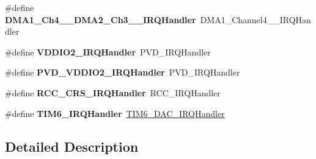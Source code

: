 \begin{DoxyCompactItemize}
\item 
\mbox{\label{group__stm32f051x8_ga035f9aa47c046222541cca70e281b415}} 
\#define {\bfseries D\+M\+A1\+\_\+\+Ch4\+\_\+\_\+\+D\+M\+A2\+\_\+\+Ch3\+\_\+\_\+\+I\+R\+Q\+Handler}~D\+M\+A1\+\_\+\+Channel4\+\_\+\_\+\+I\+R\+Q\+Handler
\item 
\mbox{\label{group__stm32f051x8_gac1854dcfbcf2950cee25063d73a5edb0}} 
\#define {\bfseries V\+D\+D\+I\+O2\+\_\+\+I\+R\+Q\+Handler}~P\+V\+D\+\_\+\+I\+R\+Q\+Handler
\item 
\mbox{\label{group__stm32f051x8_ga9a2577324b65f147fff0fc4f38dcf5e2}} 
\#define {\bfseries P\+V\+D\+\_\+\+V\+D\+D\+I\+O2\+\_\+\+I\+R\+Q\+Handler}~P\+V\+D\+\_\+\+I\+R\+Q\+Handler
\item 
\mbox{\label{group__stm32f051x8_ga82a9eac30db2cc914975bc71ce5fcb92}} 
\#define {\bfseries R\+C\+C\+\_\+\+C\+R\+S\+\_\+\+I\+R\+Q\+Handler}~R\+C\+C\+\_\+\+I\+R\+Q\+Handler
\item 
\mbox{\label{group__stm32f051x8_gae30e35a563a952a284f3f54d7f164ccd}} 
\#define {\bfseries T\+I\+M6\+\_\+\+I\+R\+Q\+Handler}~\hyperlink{group___h_a_l___time_base___t_i_m_ga0839a45f331c4c067939b9c4533bbf4d}{T\+I\+M6\+\_\+\+D\+A\+C\+\_\+\+I\+R\+Q\+Handler}
\end{DoxyCompactItemize}


\subsection{Detailed Description}

